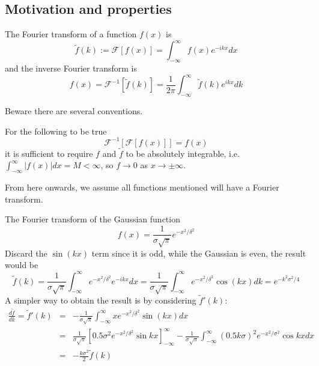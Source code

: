 \documentclass[a4paper]{article}
\begin{document}
\subsection{Motivation and properties}
\begin{defi}
The Fourier transform of a function $f(x)$ is
\begin{equation}
    \tilde{f}(k):=\mathcal{F}[f(x)]=\int_{-\infty}^\infty f(x)e^{-ikx}dx\tag{4.1}
\end{equation}
and the inverse Fourier transform is
\begin{equation}
f(x)=\mathcal{F}^{-1}[\tilde{f}(k)]=\frac{1}{2\pi}\int_{-\infty}^\infty\tilde{f}(k)e^{ikx}dk\tag{4.2}
\end{equation}
\end{defi}
Beware there are several conventions.
\begin{thm}
For the following to be true
\begin{equation}
    \mathcal{F}^{-1}[\mathcal{F}[f(x)]]=f(x)\tag{4.3}
\end{equation}
it is sufficient to require $f$ and $\tilde{f}$ to be absolutely integrable, i.e. $\int_{-\infty}^\infty|f(x)|dx=M<\infty$, so $f\rightarrow 0$ as $x\rightarrow\pm\infty$.
\end{thm}
From here onwards, we assume all functions mentioned will have a Fourier transform.
\begin{eg}[Gaussian]
The Fourier transform of the Gaussian function
\begin{equation}
    f(x)=\frac{1}{\sigma\sqrt{\pi}}e^{-x^2/\delta^2}\tag{4.4}
\end{equation}
Discard the $\sin(kx)$ term since it is odd, while the Gaussian is even, the result would be 
\begin{equation}
    \tilde{f}(k)=\frac{1}{\sigma\sqrt{\pi}}\int_{-\infty}^\infty e^{-x^2/\delta^2}e^{-ikx}dx=\frac{1}{\sigma\sqrt{\pi}}\int_{-\infty}^\infty e^{-x^2/\delta^2}\cos(kx)dk=e^{-k^2\sigma^2/4}\tag{4.5}
\end{equation}
A simpler way to obtain the result is by considering $\tilde{f}'(k)$:
\begin{eqnarray}
\frac{d\tilde{f}}{dk}=\tilde{f}'(k)&=&-\frac{1}{\sigma\sqrt{\pi}}\int_{-\infty}^\infty xe^{-x^2/\delta^2}\sin(kx)dx\nonumber\\&=&\frac{1}{\sigma\sqrt{\pi}}[0.5\sigma^2e^{-x^2/\delta^2}\sin kx]_{-\infty}^\infty -\frac{1}{\sigma\sqrt{\pi}}\int_{-\infty}^\infty(0.5k\sigma)^2e^{-x^2/\sigma^2}\cos kx dx\nonumber\\&=&-\frac{k\sigma^2}{2}\tilde{f}(k)\nonumber
\end{eqnarray}
\end{eg}
\end{document}
